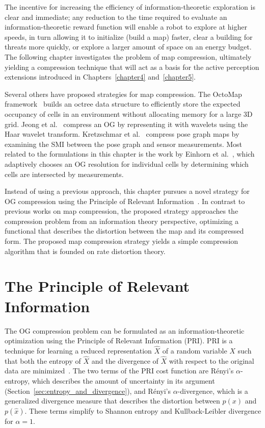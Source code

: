 The incentive for increasing the efficiency of information-theoretic exploration
is clear and immediate; any reduction to the time required to evaluate an
information-theoretic reward function will enable a robot to explore at higher
speeds, in turn allowing it to initialize (build a map) faster, clear a
building for threats more quickly, or explore a larger amount of space on an energy budget.
The following chapter investigates the problem of map compression, ultimately
yielding a compression technique that will act as a basis for the
active perception extensions introduced in Chapters~\ref{chapter4} and~\ref{chapter5}.

Several others have proposed strategies for map compression. The OctoMap
framework~\cite{wurm2010octomap} builds an octree data structure to efficiently store the
expected occupancy of cells in an environment without allocating memory for a
large 3D grid. Jeong et al.~\cite{im2010real} compress an OG by representing it with
wavelets using the Haar wavelet transform. Kretzschmar et
al.~\cite{kretzschmar2012information} compress
pose graph maps by examining the SMI between the pose
graph and sensor measurements. Most related to the formulations in this chapter is the
work by Einhorn et al.~\cite{einhorn2011finding}, which adaptively chooses an OG resolution for
individual cells by determining which cells are intersected by measurements.

Instead of using a previous approach, this chapter pursues a novel strategy for OG compression
using the Principle of Relevant Information~\cite{principe2010information}. In contrast to previous
works on map compression, the proposed strategy approaches the compression problem from an information
theory perspective, optimizing a functional that describes the distortion between the
map and its compressed form. The proposed map compression strategy yields a
simple compression algorithm that is founded on rate
distortion theory.

\section{The Principle of Relevant Information}
\label{sec:pri}

The OG compression problem can be formulated as an information-theoretic optimization
using the Principle of Relevant Information (PRI). PRI is a technique for learning a
reduced representation $\hat{X}$ of a random variable $X$ such that both the entropy of
$\hat{X}$ and the divergence of $\hat{X}$ with respect to the original data are
minimized~\cite{principe2010information}.
%
%
The two terms of the PRI cost function are R\'{e}nyi's $\alpha$-entropy, which describes
the amount of uncertainty in its argument (Section~\ref{sec:entropy_and_divergence}),
and R\'{e}nyi's $\alpha$-divergence, which is a generalized divergence
measure that describes the distortion between $p(x)$ and $p(\hat{x})$. These terms simplify
to Shannon entropy and Kullback-Leibler divergence for $\alpha = 1$.

